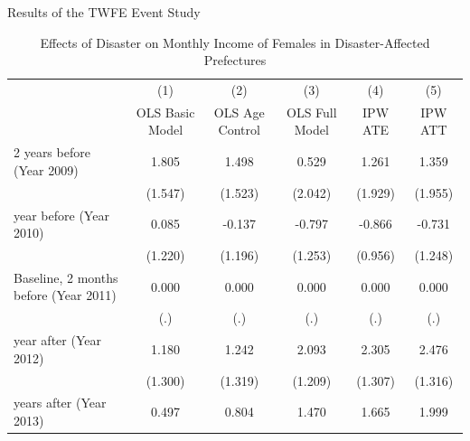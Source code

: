 \documentclass[serif, aspectratio=169]{beamer}
\begin{document}
\begin{frame}


Results of the TWFE Event Study


\begin{table}[htbp]
\centering
\caption{Effects of Disaster on Monthly Income of Females in Disaster-Affected Prefectures}


\begin{tabular}{@{\extracolsep{5pt}}lccccc}
            &\multicolumn{1}{c}{(1)}&\multicolumn{1}{c}{(2)}&\multicolumn{1}{c}{(3)}&\multicolumn{1}{c}{(4)}&\multicolumn{1}{c}{(5)}\\
            &\multicolumn{1}{c}{OLS Basic Model}&\multicolumn{1}{c}{OLS Age Control}&\multicolumn{1}{c}{OLS Full Model}&\multicolumn{1}{c}{IPW ATE}&\multicolumn{1}{c}{IPW ATT}\\
\midrule
2 years before (Year 2009)&       1.805         &       1.498         &       0.529         &       1.261         &       1.359         \\
            &     (1.547)         &     (1.523)         &     (2.042)         &     (1.929)         &     (1.955)         \\
\addlinespace
1 year before (Year 2010)&       0.085         &      -0.137         &      -0.797         &      -0.866         &      -0.731         \\
            &     (1.220)         &     (1.196)         &     (1.253)         &     (0.956)         &     (1.248)         \\
\addlinespace
Baseline, 2 months before (Year 2011)&       0.000         &       0.000         &       0.000         &       0.000         &       0.000         \\
            &         (.)         &         (.)         &         (.)         &         (.)         &         (.)         \\
\addlinespace
1 year after (Year 2012)&       1.180         &       1.242         &       2.093\sym{*}  &       2.305\sym{*}  &       2.476\sym{*}  \\
            &     (1.300)         &     (1.319)         &     (1.209)         &     (1.307)         &     (1.316)         \\
\addlinespace
2 years after (Year 2013)&       0.497         &       0.804         &       1.470         &       1.665         &       1.999         \\

\end{tabular}
\end{table}
\end{frame}
\end{document}
